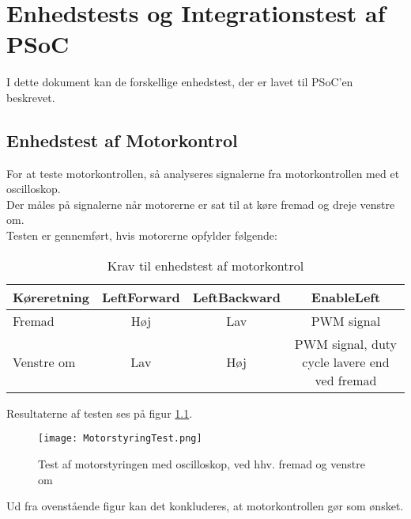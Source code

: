 %

%

\chapter{Enhedstests og Integrationstest af PSoC}
\label{appendix:BilagPSoCEnhedstests}

I dette dokument kan de forskellige enhedstest, der er lavet til PSoC'en beskrevet.

\section{Enhedstest af Motorkontrol}
For at teste motorkontrollen, så analyseres signalerne fra motorkontrollen med et oscilloskop.
\\Der måles på signalerne når motorerne er sat til at køre fremad og dreje venstre om.
\\Testen er gennemført, hvis motorerne opfylder følgende:

\begin{table}[H]
\centering
\begin{tabular}{|l|c|c|c|}
\hline
Køreretning & LeftForward & LeftBackward & EnableLeft                                   \\ \hline
Fremad      & Høj         & Lav          & PWM signal                                   \\ \hdashline
Venstre om  & Lav         & Høj          & PWM signal, duty cycle lavere end ved fremad \\ \hline
\end{tabular}
\caption{Krav til enhedstest af motorkontrol}
\label{motorkontrolenhedstest}
\end{table}

Resultaterne af testen ses på figur \ref{fig:enhedstest_motorstyring}.

\begin{figure}[H] %
\centering
\texttt{[image: MotorstyringTest.png]}
\caption{Test af motorstyringen med oscilloskop, ved hhv. fremad og venstre om}
\label{fig:enhedstest_motorstyring}
\end{figure}

Ud fra ovenstående figur kan det konkluderes, at motorkontrollen gør som ønsket.

